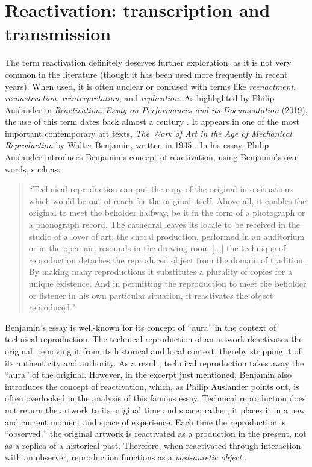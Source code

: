 \section{Reactivation: transcription and transmission}
The term reactivation definitely deserves further exploration, as it is not very common in the literature (though it has been used more frequently in recent years). When used, it is often unclear or confused with terms like \textit{reenactment}, \textit{reconstruction}, \textit{reinterpretation}, and \textit{replication}. As highlighted by Philip Auslander in \textit{Reactivation: Essay on Performances and its Documentation} (2019), the use of this term dates back almost a century \cite{auslander2018reactivations}. It appears in one of the most important contemporary art texts, \textit{The Work of Art in the Age of Mechanical Reproduction} by Walter Benjamin, written in 1935 \cite{benjamin1935work}. In his essay, Philip Auslander introduces Benjamin's concept of reactivation, using Benjamin's own words, such as:
\begin{quote}
    “Technical reproduction can put the copy of the original into situations which would be out of reach for the original itself. Above all, it enables the original to meet the beholder halfway, be it in the form of a photograph or a phonograph record. The cathedral leaves its locale to be received in the studio of a lover of art; the choral production, performed in an auditorium or in the open air, resounds in the drawing room [...] the technique of reproduction detaches the reproduced object from the domain of tradition. By making many reproductions it substitutes a plurality of copies for a unique existence. And in permitting the reproduction to meet the beholder or listener in his own particular situation, it reactivates the object reproduced." \cite{benjamin1935work}
\end{quote}
Benjamin's essay is well-known for its concept of ``aura'' in the context of technical reproduction. The technical reproduction of an artwork deactivates the original, removing it from its historical and local context, thereby stripping it of its authenticity and authority. As a result, technical reproduction takes away the ``aura'' of the original. However, in the excerpt just mentioned, Benjamin also introduces the concept of reactivation, which, as Philip Auslander points out, is often overlooked in the analysis of this famous essay. Technical reproduction does not return the artwork to its original time and space; rather, it places it in a new and current moment and space of experience. Each time the reproduction is ``observed,'' the original artwork is reactivated as a production in the present, not as a replica of a historical past. Therefore, when reactivated through interaction with an observer, reproduction functions as a \textit{post-auretic object} \cite{auslander2018reactivations}.\\
